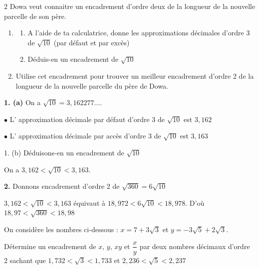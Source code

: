 \begin{multicols*}{2}
  	Dowa veut connaitre un encadrement d’ordre deux de 
  	la longueur de la nouvelle parcelle de son père.
  	\begin{enumerate}
  		\item 
  		\begin{enumerate}
  			\item A l'aide de ta calculatrice, donne les 
  			approximations décimales d’ordre 3 de $\sqrt{10}$ (par défaut et par excès)
  			\item Déduis-en un encadrement de $\sqrt{10}$ 
  		\end{enumerate}
  		\item Utilise cet encadrement pour trouver un meilleur 
  		encadrement d’ordre 2 de la longueur de la 
  		nouvelle parcelle du père de Dowa.
  	\end{enumerate}
  	\dure
  	\resul
  	\textbf{1. (a)} On a $\sqrt{10}=3,162277....$
  	
  	$\bullet$ L' approximation décimale par défaut d’ordre 3 de $\sqrt{10}$ est $3,162$
  	
  	$\bullet$ L' approximation décimale par accès d’ordre 3 de $\sqrt{10}$ est $3,163$
  	
  	1. (b) Déduisons-en un encadrement de $\sqrt{10}$
  	
  	On a $3,162<\sqrt{10}<3,163$.
  	
  	\textbf{2.} Donnons encadrement d'ordre 2 de  $\sqrt{360}=6\sqrt{10}$ 
  	
  	$3,162<\sqrt{10}<3,163$ équivaut à $18,972<6\sqrt{10}<18,978$. D'où $18,97<\sqrt{360}<18,98$
  	
  	
  	On considère les nombres ci-dessous :
  	$x=7+3\sqrt{3}$ et $ y=-3\sqrt{5}+2\sqrt{3}$.
  	
  	Détermine un encadrement de $x$, $y$, $xy$
  	et $\dfrac{x}{y}$   par deux nombres décimaux d'ordre 2 sachant que 
  	$1,732< \sqrt{3} <1,733$ et $2,236 <\sqrt{5} <2,237$
  	

\end{multicols*}
